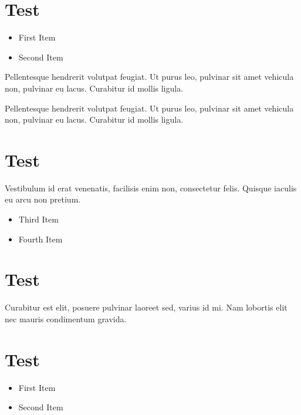 \documentclass{scrartcl}
\begin{document}
\section{Test}
\begin{itemize}
\item First Item
\item Second Item
\end{itemize}

Pellentesque hendrerit volutpat feugiat. Ut purus
leo, pulvinar sit amet vehicula non, pulvinar eu
lacus. Curabitur id mollis ligula.

Pellentesque hendrerit volutpat feugiat. Ut purus
leo, pulvinar sit amet vehicula non, pulvinar eu
lacus. Curabitur id mollis ligula.


\section{Test}

Vestibulum id erat venenatis, facilisis enim non,
consectetur felis. Quisque iaculis eu arcu non pretium.

\begin{itemize}
\item Third Item
\item Fourth Item
\end{itemize}

\section{Test}
Curabitur est elit, posuere pulvinar laoreet sed, varius
id mi. Nam lobortis elit nec mauris condimentum gravida.

\clearpage
\makeatletter
\newif\if@aaa
{}
\makeatother

\section{Test}
\begin{itemize}
\item First Item
\item Second Item
\end{itemize}
\end{document}
